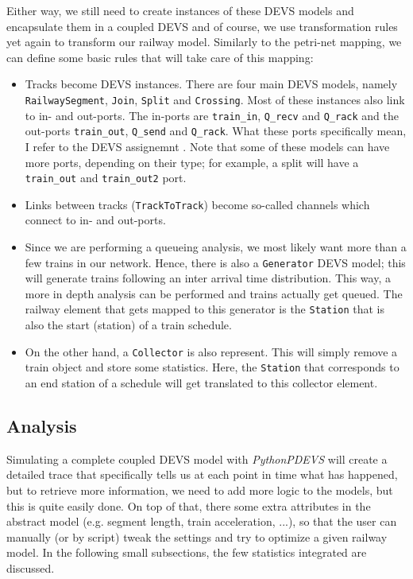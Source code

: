\documentclass{article}
\begin{document}
Either way, we still need to create instances of these DEVS models and encapsulate them in a coupled DEVS and of course, we use transformation rules yet again to transform our railway model. Similarly to the petri-net mapping, we can define some basic rules that will take care of this mapping:

\begin{itemize}
    \item Tracks become DEVS instances. There are four main DEVS models, namely \texttt{RailwaySegment}, \texttt{Join}, \texttt{Split} and \texttt{Crossing}. Most of these instances also link to in- and out-ports. The in-ports are \texttt{train\_in}, \texttt{Q\_recv} and \texttt{Q\_rack} and the out-ports \texttt{train\_out}, \texttt{Q\_send} and \texttt{Q\_rack}. What these ports specifically mean, I refer to the DEVS assignemnt \cite{devs_assignment}. Note that some of these models can have more ports, depending on their type; for example, a split will have a \texttt{train\_out} and \texttt{train\_out2} port.
    \item Links between tracks (\texttt{TrackToTrack}) become so-called channels which connect to in- and out-ports.
    \item Since we are performing a queueing analysis, we most likely want more than a few trains in our network. Hence, there is also a \texttt{Generator} DEVS model; this will generate trains following an inter arrival time distribution. This way, a more in depth analysis can be performed and trains actually get queued. The railway element that gets mapped to this generator is the \texttt{Station} that is also the start (station) of a train schedule.
    \item On the other hand, a \texttt{Collector} is also represent. This will simply remove a train object and store some statistics. Here, the \texttt{Station} that corresponds to an end station of a schedule will get translated to this collector element.
\end{itemize}

\subsection{Analysis}

Simulating a complete coupled DEVS model with \textit{PythonPDEVS} will create a detailed trace that specifically tells us at each point in time what has happened, but to retrieve more information, we need to add more logic to the models, but this is quite easily done. On top of that, there some extra attributes in the abstract model (e.g. segment length, train acceleration, ...), so that the user can manually (or by script) tweak the settings and try to optimize a given railway model. In the following small subsections, the few statistics integrated are discussed.
\end{document}
